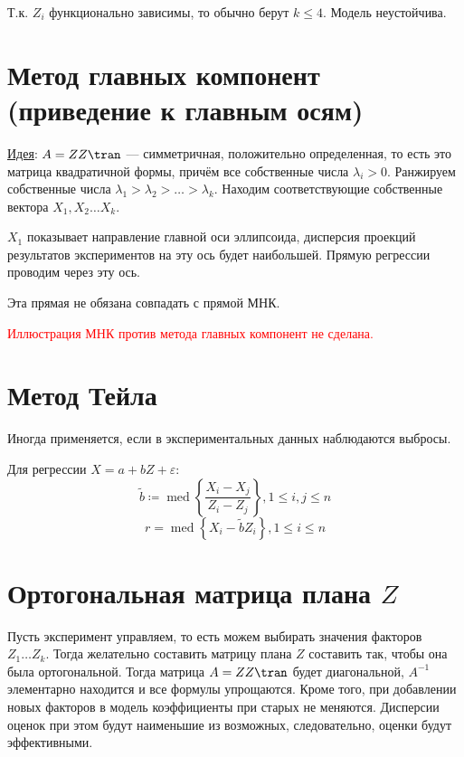 \begin{remark}
    Т.к. \(Z_i\) функционально зависимы, то обычно берут \(k \leq 4\). Модель неустойчива.
\end{remark}

\section{Метод главных компонент (приведение к главным осям)}

\underline{Идея}: \(A = ZZ\tran\) --- симметричная, положительно определенная, то есть это матрица квадратичной формы, причём все собственные числа \(\lambda_i > 0\). Ранжируем собственные числа \(\lambda_1 > \lambda_2 > \dots > \lambda_k\). Находим соответствующие собственные вектора \(X_1, X_2 \dots X_k\).

\(X_1\) показывает направление главной оси эллипсоида, дисперсия проекций результатов экспериментов на эту ось будет наибольшей. Прямую регрессии проводим через эту ось.

\begin{remark}
    Эта прямая не обязана совпадать с прямой МНК.
\end{remark}

\textcolor{red}{Иллюстрация МНК против метода главных компонент не сделана.}

\section{Метод Тейла}

Иногда применяется, если в экспериментальных данных наблюдаются выбросы.

Для регрессии \(X = a + bZ + \varepsilon\):
\[\tilde{b} \coloneqq \operatorname{med}\left\{\frac{X_i - X_j}{Z_i - Z_j}\right\}, 1 \leq i, j \leq n\]
\[r = \operatorname{med}\left\{X_i - \tilde{b} Z_i\right\}, 1 \leq i \leq n\]

\section{Ортогональная матрица плана \(Z\)}

Пусть эксперимент управляем, то есть можем выбирать значения факторов \(Z_1 \dots Z_k\). Тогда желательно составить матрицу плана \(Z\) составить так, чтобы она была ортогональной. Тогда матрица \(A = ZZ\tran\) будет диагональной, \(A^{-1}\) элементарно находится и все формулы упрощаются. Кроме того, при добавлении новых факторов в модель коэффициенты при старых не меняются. Дисперсии оценок при этом будут наименьшие из возможных, следовательно, оценки будут эффективными.
